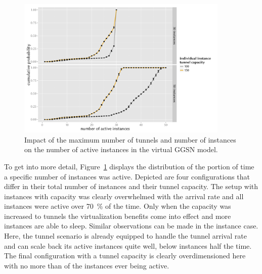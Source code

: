 \begin{figure}[htbp]
	\centering
	\includegraphics[width=0.9\textwidth]{images/R-virtualized-instanceuse.pdf}
	\caption{Impact of the maximum number of tunnels and number of instances on the number of active instances in the virtual \acrshort{GGSN} model.}
\label{c4:fig:virtualized_instanceuse}
\end{figure}

To get into more detail, Figure~\ref{c4:fig:virtualized_instanceuse} displays the distribution of the portion of time a specific number of instances was active. Depicted are four configurations that differ in their total number of instances and their tunnel capacity. The setup with  instances with  capacity was clearly overwhelmed with the arrival rate and all  instances were active over \SI{70}{\percent} of the time. Only when the capacity was increased to  tunnels the virtualization benefits come into effect and more instances are able to sleep. Similar observations can be made in the  instance case.  Here, the  tunnel scenario is already equipped to handle the tunnel arrival rate and can scale back its active instances quite well, below  instances half the time. The final configuration with a  tunnel capacity is clearly overdimensioned here with no more than  of the  instances ever being active.

